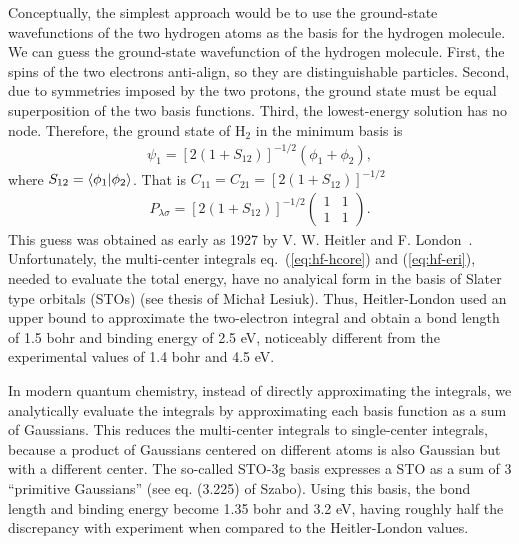 Conceptually, the simplest approach would be to use the ground-state wavefunctions of the two hydrogen atoms as the basis for the hydrogen molecule. We can guess the ground-state wavefunction of the hydrogen molecule. First, the spins of the two electrons anti-align, so they are distinguishable particles. Second, due to symmetries imposed by the two protons, the ground state must be equal superposition of the two basis functions. Third, the lowest-energy solution has no node. Therefore, the ground state of H$_2$ in the minimum basis is
\begin{align}
\psi_1 = \left[2(1+S_{12})\right]^{-1/2} \left(
\phi_1 + \phi_2
\right),
\end{align}
where $S_{12}=\braket{\phi_1|\phi_2}$. That is $C_{11}=C_{21}=\left[2(1+S_{12})\right]^{-1/2}$
\begin{align} \label{eq:h2-pmat}
P_{\lambda\sigma} = \left[2(1+S_{12})\right]^{-1/2}\left(\begin{array}{cc}
1 & 1 \\
1 & 1
\end{array}\right).
\end{align}
This guess was obtained as early as 1927 by V. W. Heitler and F. London~\cite{Heitler1927}. Unfortunately, the multi-center integrals eq.~(\ref{eq:hf-hcore}) and (\ref{eq:hf-eri}), needed to evaluate the total energy, have no analyical form in the basis of Slater type orbitals (STOs) (see thesis of Michał Lesiuk). Thus, Heitler-London used an upper bound to approximate the two-electron integral and obtain a bond length of 1.5 bohr and binding energy of 2.5 eV, noticeably different from the experimental values of 1.4 bohr and 4.5 eV.

In modern quantum chemistry, instead of directly approximating the integrals, we analytically evaluate the integrals by approximating each basis function as a sum of Gaussians. This reduces the multi-center integrals to single-center integrals, because a product of Gaussians centered on different atoms is also Gaussian but with a different center. The so-called STO-3g basis expresses a STO as a sum of 3 ``primitive Gaussians'' (see eq. (3.225) of Szabo). Using this basis, the bond length and binding energy become 1.35 bohr and 3.2 eV, having roughly half the discrepancy with experiment when compared to the Heitler-London values.


